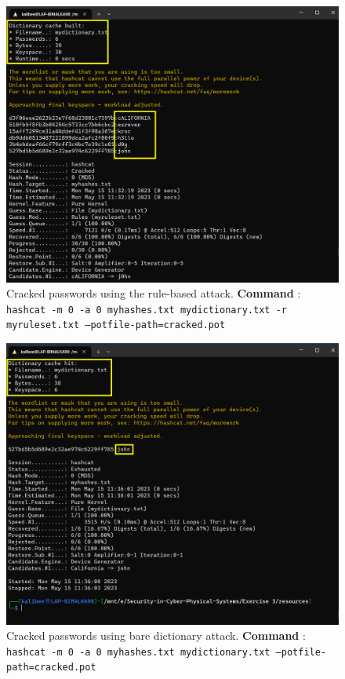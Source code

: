 \documentclass[11pt,letterpaper]{article}
\newenvironment{answer}{\em \color{blue} \begin{adjustwidth}{1cm}{1cm}}{\end{adjustwidth}}
\begin{document}
\begin{enumerate}
\begin{answer}
			\begin{figure}[h]
				\centering
				\includegraphics[width=0.7\columnwidth]{images/cracked_with_rules}
				\caption{Cracked passwords using the rule-based attack. \textbf{Command} : {\tt hashcat -m 0 -a 0 myhashes.txt mydictionary.txt -r myruleset.txt --potfile-path=cracked.pot}} \label{fig:cracked_with_rules}
			\end{figure}
			
			\begin{figure}[h]
				\centering
				\includegraphics[width=0.7\columnwidth]{images/cracked_with_norules}
				\caption{Cracked passwords using bare dictionary attack. \textbf{Command} : {\tt hashcat -m 0 -a 0 myhashes.txt mydictionary.txt --potfile-path=cracked.pot}} \label{fig:cracked_with_norules}
			\end{figure}
		\end{answer}
		
	\end{enumerate}
	
\end{document}
